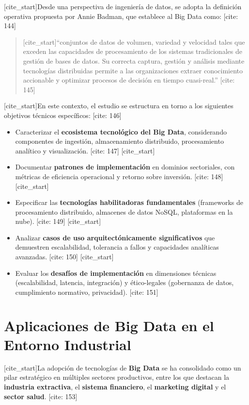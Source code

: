 \documentclass[12pt, a4paper]{article}
\begin{document}
[cite_start]Desde una perspectiva de ingeniería de datos, se adopta la definición operativa propuesta por Annie Badman, que establece al Big Data como: [cite: 144]
\begin{quote}
[cite_start]“conjuntos de datos de volumen, variedad y velocidad tales que exceden las capacidades de procesamiento de los sistemas tradicionales de gestión de bases de datos. Su correcta captura, gestión y análisis mediante tecnologías distribuidas permite a las organizaciones extraer conocimiento accionable y optimizar procesos de decisión en tiempo cuasi-real.” [cite: 145]
\end{quote}

[cite_start]En este contexto, el estudio se estructura en torno a los siguientes objetivos técnicos específicos: [cite: 146]
\begin{itemize}
    [cite_start]\item Caracterizar el \textbf{ecosistema tecnológico del Big Data}, considerando componentes de ingestión, almacenamiento distribuido, procesamiento analítico y visualización. [cite: 147]
    [cite_start]\item Documentar \textbf{patrones de implementación} en dominios sectoriales, con métricas de eficiencia operacional y retorno sobre inversión. [cite: 148]
    [cite_start]\item Especificar las \textbf{tecnologías habilitadoras fundamentales} (frameworks de procesamiento distribuido, almacenes de datos NoSQL, plataformas en la nube). [cite: 149]
    [cite_start]\item Analizar \textbf{casos de uso arquitectónicamente significativos} que demuestren escalabilidad, tolerancia a fallos y capacidades analíticas avanzadas. [cite: 150]
    [cite_start]\item Evaluar los \textbf{desafíos de implementación} en dimensiones técnicas (escalabilidad, latencia, integración) y ético-legales (gobernanza de datos, cumplimiento normativo, privacidad). [cite: 151]
\end{itemize}

\section{Aplicaciones de Big Data en el Entorno Industrial}
[cite_start]La adopción de tecnologías de \textbf{Big Data} se ha consolidado como un pilar estratégico en múltiples sectores productivos, entre los que destacan la \textbf{industria extractiva}, el \textbf{sistema financiero}, el \textbf{marketing digital} y el \textbf{sector salud}. [cite: 153]
\end{document}
